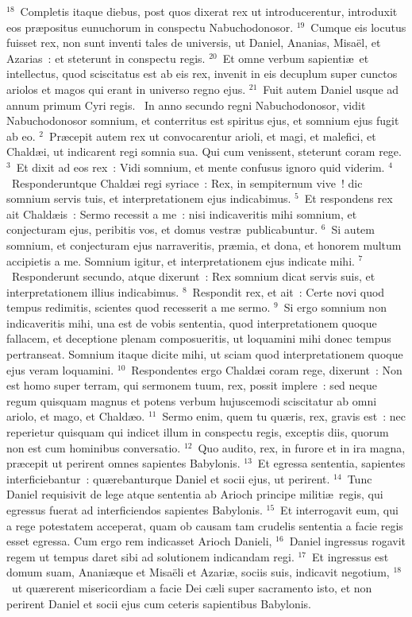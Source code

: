 ${}^{18}$~Completis itaque diebus, post quos dixerat rex ut introducerentur, introduxit eos pr\ae positus eunuchorum in conspectu Nabuchodonosor.
${}^{19}$~Cumque eis locutus fuisset rex, non sunt inventi tales de universis, ut Daniel, Ananias, Misa\"el, et Azarias~: et steterunt in conspectu regis.
${}^{20}$~Et omne verbum sapienti\ae\ et intellectus, quod sciscitatus est ab eis rex, invenit in eis decuplum super cunctos ariolos et magos qui erant in universo regno ejus.
${}^{21}$~Fuit autem Daniel usque ad annum primum Cyri regis.
~In anno secundo regni Nabuchodonosor, vidit Nabuchodonosor somnium, et conterritus est spiritus ejus, et somnium ejus fugit ab eo.
${}^{2}$~Pr\ae cepit autem rex ut convocarentur arioli, et magi, et malefici, et Chald\ae i, ut indicarent regi somnia sua. Qui cum venissent, steterunt coram rege.
${}^{3}$~Et dixit ad eos rex~: Vidi somnium, et mente confusus ignoro quid viderim.
${}^{4}$~Responderuntque Chald\ae i regi syriace~: Rex, in sempiternum vive~! dic somnium servis tuis, et interpretationem ejus indicabimus.
${}^{5}$~Et respondens rex ait Chald\ae is~: Sermo recessit a me~: nisi indicaveritis mihi somnium, et conjecturam ejus, peribitis vos, et domus vestr\ae\ publicabuntur.
${}^{6}$~Si autem somnium, et conjecturam ejus narraveritis, pr\ae mia, et dona, et honorem multum accipietis a me. Somnium igitur, et interpretationem ejus indicate mihi.
${}^{7}$~Responderunt secundo, atque dixerunt~: Rex somnium dicat servis suis, et interpretationem illius indicabimus.
${}^{8}$~Respondit rex, et ait~: Certe novi quod tempus redimitis, scientes quod recesserit a me sermo.
${}^{9}$~Si ergo somnium non indicaveritis mihi, una est de vobis sententia, quod interpretationem quoque fallacem, et deceptione plenam composueritis, ut loquamini mihi donec tempus pertranseat. Somnium itaque dicite mihi, ut sciam quod interpretationem quoque ejus veram loquamini.
${}^{10}$~Respondentes ergo Chald\ae i coram rege, dixerunt~: Non est homo super terram, qui sermonem tuum, rex, possit implere~: sed neque regum quisquam magnus et potens verbum hujuscemodi sciscitatur ab omni ariolo, et mago, et Chald\ae o.
${}^{11}$~Sermo enim, quem tu qu\ae ris, rex, gravis est~: nec reperietur quisquam qui indicet illum in conspectu regis, exceptis diis, quorum non est cum hominibus conversatio.
${}^{12}$~Quo audito, rex, in furore et in ira magna, pr\ae cepit ut perirent omnes sapientes Babylonis.
${}^{13}$~Et egressa sententia, sapientes interficiebantur~: qu\ae rebanturque Daniel et socii ejus, ut perirent.
${}^{14}$~Tunc Daniel requisivit de lege atque sententia ab Arioch principe militi\ae\ regis, qui egressus fuerat ad interficiendos sapientes Babylonis.
${}^{15}$~Et interrogavit eum, qui a rege potestatem acceperat, quam ob causam tam crudelis sententia a facie regis esset egressa. Cum ergo rem indicasset Arioch Danieli,
${}^{16}$~Daniel ingressus rogavit regem ut tempus daret sibi ad solutionem indicandam regi.
${}^{17}$~Et ingressus est domum suam, Anani\ae que et Misa\"eli et Azari\ae , sociis suis, indicavit negotium,
${}^{18}$~ut qu\ae rerent misericordiam a facie Dei c\ae li super sacramento isto, et non perirent Daniel et socii ejus cum ceteris sapientibus Babylonis.


